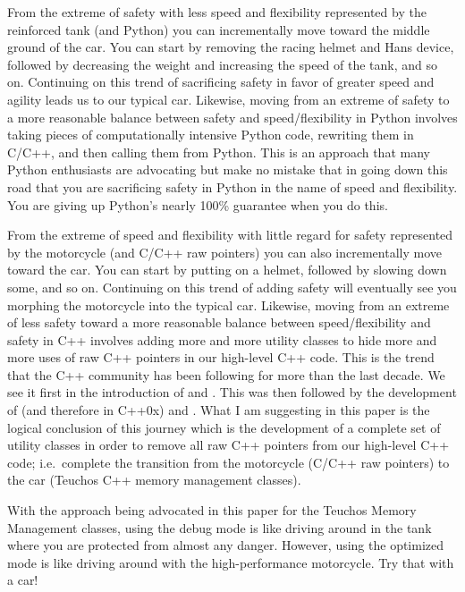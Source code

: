 \documentclass[pdf,ps2pdf,11pt]{SANDreport}
\begin{document}
From the extreme of safety with less speed and flexibility represented
by the reinforced tank (and Python) you can incrementally move toward
the middle ground of the car. You can start by removing the racing
helmet and Hans device, followed by decreasing the weight and
increasing the speed of the tank, and so on.  Continuing on this trend
of sacrificing safety in favor of greater speed and agility leads us
to our typical car.  Likewise, moving from an extreme of safety to a
more reasonable balance between safety and speed/flexibility in Python
involves taking pieces of computationally intensive Python code,
rewriting them in C/C++, and then calling them from Python.  This is
an approach that many Python enthusiasts are advocating
{}\cite{PythonForSCPerforamnce08} but make no mistake that in going
down this road that you are sacrificing safety in Python in the name
of speed and flexibility.  You are giving up Python's nearly 100\%
guarantee when you do this.

From the extreme of speed and flexibility with little regard for
safety represented by the motorcycle (and C/C++ raw pointers) you can
also incrementally move toward the car.  You can start by putting on a
helmet, followed by slowing down some, and so on.  Continuing on this
trend of adding safety will eventually see you morphing the motorcycle
into the typical car.  Likewise, moving from an extreme of less safety
toward a more reasonable balance between speed/flexibility and safety
in C++ involves adding more and more utility classes to hide more and
more uses of raw C++ pointers in our high-level C++ code.  This is the
trend that the C++ community has been following for more than the last
decade.  We see it first in the introduction of
{} and {}.  This was then
followed by the development of {} (and
therefore {} in C++0x) and
{}.  What I am suggesting in this paper is
the logical conclusion of this journey which is the development of a
complete set of utility classes in order to remove all raw C++
pointers from our high-level C++ code; i.e.\ complete the transition
from the motorcycle (C/C++ raw pointers) to the car (Teuchos C++
memory management classes).

With the approach being advocated in this paper for the Teuchos Memory
Management classes, using the debug mode is like driving around in the
tank where you are protected from almost any danger.  However, using
the optimized mode is like driving around with the high-performance
motorcycle.  Try that with a car!
\end{document}
